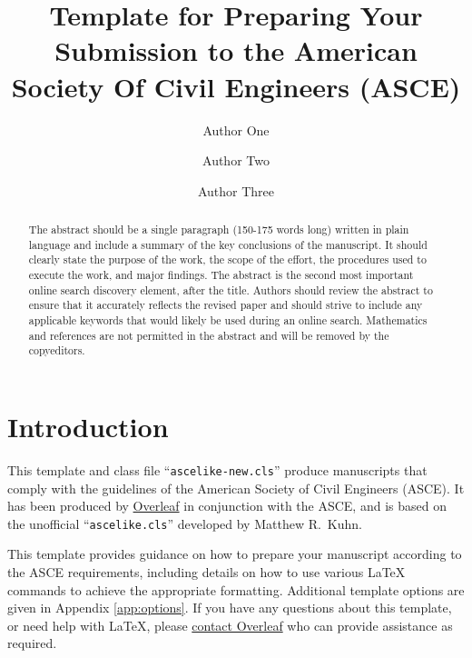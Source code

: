 \documentclass[Journal,letterpaper]{ascelike-new}
\begin{document}
	
	\title{Template for Preparing Your Submission to the American Society Of Civil Engineers (ASCE)}
	
	\author[1]{Author One}
	\author[2]{Author Two}
	\author[3]{Author Three}
	
	
	\maketitle
	
	\begin{abstract}
		The abstract should be a single paragraph (150-175 words long) written in plain language and include a summary of the key conclusions of the manuscript. It should clearly state the purpose of the work, the scope of the effort, the procedures used to execute the work, and major findings. The abstract is the second most important online search discovery element, after the title. Authors should review the abstract to ensure that it accurately reflects the revised paper and should strive to include any applicable keywords that would likely be used during an online search. Mathematics and references are not permitted in the abstract and will be removed by the copyeditors.
	\end{abstract}
	
	\section{Introduction}
	This template and class file ``\texttt{ascelike-new.cls}'' produce manuscripts that comply with the guidelines of the American Society of Civil Engineers (ASCE). It has been produced by \href{https://www.overleaf.com}{Overleaf} in conjunction with the ASCE, and is based on the unofficial ``\texttt{ascelike.cls}'' developed by Matthew R.~Kuhn.
	
	This template provides guidance on how to prepare your manuscript according to the ASCE requirements, including details on how to use various LaTeX commands to achieve the appropriate formatting. Additional template options are given in Appendix \ref{app:options}. If you have any questions about this template, or need help with LaTeX, please \href{https://www.overleaf.com/contact}{contact Overleaf} who can provide assistance as required.
	
\end{document}
